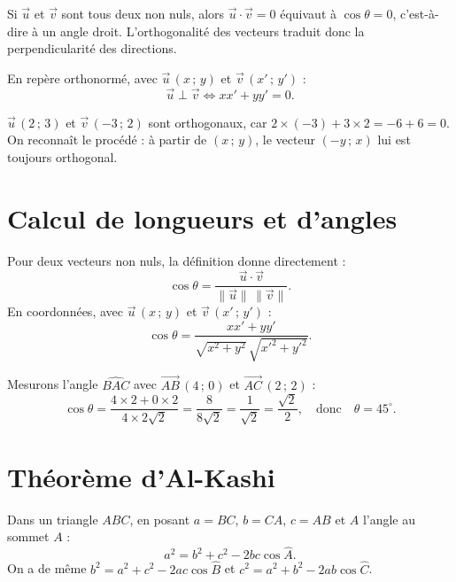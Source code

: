 \begin{remarque}
Si $\vec{u}$ et $\vec{v}$ sont tous deux non nuls, alors $\vec{u}\cdot\vec{v}=0$
équivaut à $\cos\theta=0$, c'est-à-dire à un angle droit. L'orthogonalité des vecteurs
traduit donc la perpendicularité des directions.
\end{remarque}

\begin{propriete}
En repère orthonormé, avec $\vec{u}\,(x\,;\,y)$ et $\vec{v}\,(x'\,;\,y')$ :
\[ \vec{u}\perp\vec{v}\iff xx'+yy'=0. \]
\end{propriete}

\begin{exemple}
$\vec{u}\,(2\,;\,3)$ et $\vec{v}\,(-3\,;\,2)$ sont orthogonaux, car
$2\times(-3)+3\times 2=-6+6=0$. On reconnaît le procédé : à partir de $(x\,;\,y)$, le
vecteur $(-y\,;\,x)$ lui est toujours orthogonal.
\end{exemple}

\section{Calcul de longueurs et d'angles}

\begin{propriete}
Pour deux vecteurs non nuls, la définition donne directement :
\[ \cos\theta=\frac{\vec{u}\cdot\vec{v}}{\|\vec{u}\|\,\|\vec{v}\|}. \]
En coordonnées, avec $\vec{u}\,(x\,;\,y)$ et $\vec{v}\,(x'\,;\,y')$ :
\[ \cos\theta=\frac{xx'+yy'}{\sqrt{x^2+y^2}\,\sqrt{x'^2+y'^2}}. \]
\end{propriete}

\begin{exemple}
Mesurons l'angle $\widehat{BAC}$ avec $\vec{AB}\,(4\,;\,0)$ et $\vec{AC}\,(2\,;\,2)$ :
\[ \cos\theta=\frac{4\times 2+0\times 2}{4\times 2\sqrt{2}}=\frac{8}{8\sqrt2}
   =\frac{1}{\sqrt2}=\frac{\sqrt2}{2},\quad\text{donc}\quad\theta=45^\circ. \]
\end{exemple}

\section{Théorème d'Al-Kashi}

\begin{theoreme}
Dans un triangle $ABC$, en posant $a=BC$, $b=CA$, $c=AB$ et $\widehat{A}$ l'angle au
sommet $A$ :
\[ a^2=b^2+c^2-2bc\cos\widehat{A}. \]
On a de même $b^2=a^2+c^2-2ac\cos\widehat{B}$ et
$c^2=a^2+b^2-2ab\cos\widehat{C}$.
\end{theoreme}

